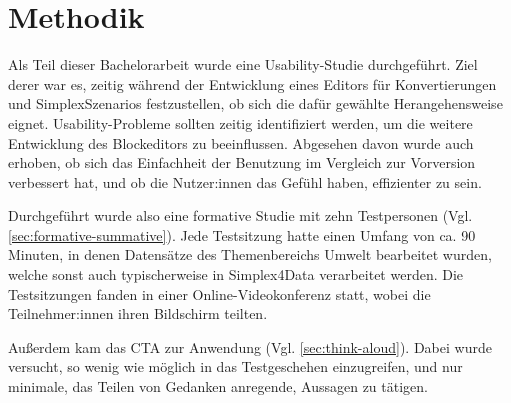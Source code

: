 \section{Methodik}

Als Teil dieser Bachelorarbeit wurde eine Usability-Studie durchgeführt. Ziel derer war es, zeitig während der Entwicklung eines Editors für Konvertierungen und SimplexSzenarios festzustellen, ob sich die dafür gewählte Herangehensweise eignet. Usability-Probleme sollten zeitig identifiziert werden, um die weitere Entwicklung des Blockeditors zu beeinflussen. Abgesehen davon wurde auch erhoben, ob sich das Einfachheit der Benutzung im Vergleich zur Vorversion verbessert hat, und ob die Nutzer:innen das Gefühl haben, effizienter zu sein.

Durchgeführt wurde also eine formative Studie mit zehn Testpersonen (Vgl. \ref{sec:formative-summative}). Jede Testsitzung hatte einen Umfang von ca. 90 Minuten, in denen Datensätze des Themenbereichs Umwelt bearbeitet wurden, welche sonst auch typischerweise in Simplex4Data verarbeitet werden. Die Testsitzungen fanden in einer Online-Videokonferenz statt, wobei die Teilnehmer:innen ihren Bildschirm teilten.

Außerdem kam das \acf{CTA} zur Anwendung (Vgl. \ref{sec:think-aloud}). Dabei wurde versucht, so wenig wie möglich in das Testgeschehen einzugreifen, und nur minimale, das Teilen von Gedanken anregende, Aussagen zu tätigen.
